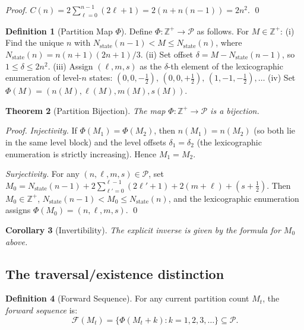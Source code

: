 \documentclass[twocolumn,10pt,a4paper]{article}
\theoremstyle{thmstyle}
\newtheorem{theorem}{Theorem}[section]
\newtheorem{corollary}[theorem]{Corollary}
\theoremstyle{definition}
\newtheorem{definition}[theorem]{Definition}
\theoremstyle{remark}
\newcommand{\Zp}{\mathbb{Z}^{+}}
\newcommand{\Mcyc}{M}
\newcommand{\Parts}{\mathcal{P}}
\newcommand{\PhiMap}{\varPhi}
\newcommand{\calF}{\mathcal{F}}
\begin{document}
\begin{proof}
$C(n) = 2\sum_{\ell=0}^{n-1}(2\ell+1) = 2(n + n(n-1)) = 2n^2$. \qed
\end{proof}

\begin{definition}[Partition Map $\PhiMap$]
\label{def:phi}
Define $\PhiMap: \Zp \to \Parts$ as follows. For $M \in \Zp$:
(i) Find the unique $n$ with $N_{\text{state}}(n-1) < M \leq N_{\text{state}}(n)$,
where $N_{\text{state}}(n) = n(n+1)(2n+1)/3$.
(ii) Set offset $\delta = M - N_{\text{state}}(n-1)$, so $1 \leq \delta \leq 2n^2$.
(iii) Assign $(\ell, m, s)$ as the $\delta$-th element of the lexicographic
enumeration of level-$n$ states:
$(0,0,-\tfrac{1}{2}),\,(0,0,+\tfrac{1}{2}),\,(1,-1,-\tfrac{1}{2}),\ldots$
(iv) Set $\PhiMap(M) = (n(\Mcyc), \ell(\Mcyc), m(\Mcyc), s(\Mcyc))$.
\end{definition}

\begin{theorem}[Partition Bijection]
\label{thm:bijection}
The map $\PhiMap: \Zp \to \Parts$ is a bijection.
\end{theorem}

\begin{proof}
\textit{Injectivity.} If $\PhiMap(M_1) = \PhiMap(M_2)$, then
$n(M_1) = n(M_2)$ (so both lie in the same level block) and the
level offsets $\delta_1 = \delta_2$ (the lexicographic enumeration
is strictly increasing). Hence $M_1 = M_2$.

\textit{Surjectivity.} For any $(n,\ell,m,s) \in \Parts$, set
$M_0 = N_{\text{state}}(n-1) + 2\sum_{\ell'=0}^{\ell-1}(2\ell'+1) + 2(m+\ell) + (s+\tfrac{1}{2})$.
Then $M_0 \in \Zp$, $N_{\text{state}}(n-1) < M_0 \leq N_{\text{state}}(n)$,
and the lexicographic enumeration assigns $\PhiMap(M_0) = (n,\ell,m,s)$.
\qed
\end{proof}

\begin{corollary}[Invertibility]
The explicit inverse is given by the formula for $M_0$ above.
\end{corollary}

\subsection{The traversal/existence distinction}

\begin{definition}[Forward Sequence]
For any current partition count $M_t$, the \emph{forward sequence} is:
\begin{equation}
\calF(M_t) = \{\PhiMap(M_t + k) : k = 1, 2, 3, \ldots\} \subseteq \Parts.
\label{eq:forward}
\end{equation}
\end{definition}
\end{document}
